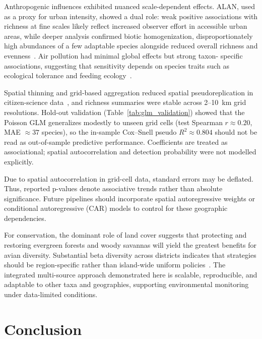 \documentclass[conference]{IEEEtran}
\begin{document}
Anthropogenic influences exhibited nuanced scale-dependent effects. ALAN, used as a proxy for urban intensity, showed a dual role: weak positive associations with richness at fine scales likely reflect increased observer effort in accessible urban areas, while deeper analysis confirmed biotic homogenization, disproportionately high abundances of a few adaptable species alongside reduced overall richness and evenness~\cite{ref13,ref15}. Air pollution had minimal global effects but strong taxon- specific associations, suggesting that sensitivity depends on species traits such as ecological tolerance and feeding ecology~\cite{ref12,ref14}. 

Spatial thinning and grid-based aggregation reduced spatial pseudoreplication in citizen-science data~\cite{ref9}, and richness summaries were stable across 2--10~km grid resolutions. Hold-out validation (Table~\ref{tab:glm_validation}) showed that the Poisson GLM generalizes modestly to unseen grid cells (test Spearman $r \approx 0.20$, MAE $\approx 37$ species), so the in-sample Cox--Snell pseudo $R^2 \approx 0.804$ should not be read as out-of-sample predictive performance. Coefficients are treated as associational; spatial autocorrelation and detection probability were not modelled explicitly. 

Due to spatial autocorrelation in grid-cell data, standard errors may be deflated. Thus, reported p-values denote associative trends rather than absolute significance. Future pipelines should incorporate spatial autoregressive weights or conditional autoregressive (CAR) models to control for these geographic dependencies. 

For conservation, the dominant role of land cover suggests that protecting and restoring evergreen forests and woody savannas will yield the greatest benefits for avian diversity. Substantial beta diversity across districts indicates that strategies should be region-specific rather than island-wide uniform policies~\cite{ref16}. The integrated multi-source approach demonstrated here is scalable, reproducible, and adaptable to other taxa and geographies, supporting environmental monitoring under data-limited conditions.

\section{Conclusion}
\end{document}
